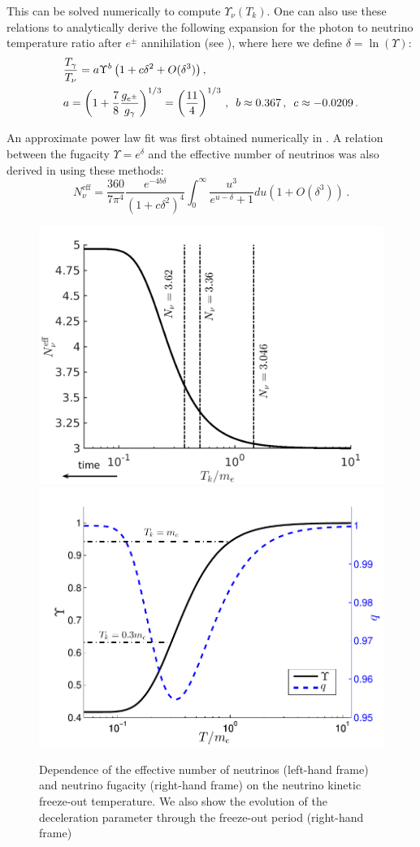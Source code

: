 This can be solved numerically to compute $\Upsilon_\nu(T_k)$. One can also use these relations to analytically derive the following expansion for the photon to neutrino temperature ratio after $e^\pm$ annihilation (see \cite{Birrell:2012gg}), where here we define $\delta=\ln(\Upsilon)$:
\begin{align}\label{eq:UpsilonRatio}
&\frac{T_\gamma}{T_\nu}=a\Upsilon^{b}\left(1+c\delta^2+O(\delta^3)\right),\\
\label{value_a}
&a=\left(1+\frac{7}{8}\frac{g_{e^\pm}}{g_\gamma}\right)^{1/3}=\left(\frac{11}{4}\right)^{1/3}\,,\,\,\,b\approx 0.367\,, \,\,\,c\approx -0.0209\,.\notag
\end{align}

An approximate power law fit was first obtained numerically in \cite{Birrell:2013gpa}. A relation between the fugacity $\Upsilon=e^\delta$ and the effective number of neutrinos  was also derived in \cite{Birrell:2012gg} using these methods:
\begin{equation}\label{eq:NnuApprox}
N^{\mathrm{eff}}_\nu=\frac{360}{7\pi^4}\frac{e^{-4b\delta}}{(1+c\delta^2)^4}\int_0^\infty \frac{u^3}{e^{u-\delta}+1}du\left(1+O(\delta^3)\right)\,.
\end{equation}


\begin{figure}
\centerline{\includegraphics[width=0.51\linewidth]{plots/N_eff.pdf}\hspace{-0.95cm}
\includegraphics[width=0.50\linewidth]{plots/Upsilon_q.pdf}}
\caption{Dependence of the effective number of neutrinos (left-hand frame) and neutrino fugacity (right-hand frame) on the neutrino kinetic freeze-out temperature. We also show the evolution of the deceleration parameter through the freeze-out period (right-hand frame)}
\label{fig:Tk_dependence}
\end{figure}

